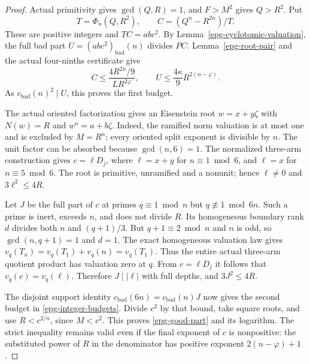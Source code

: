 \begin{proof}
Actual primitivity gives $\gcd(Q,R)=1$, and $F>M^2$ gives
$Q>R^2$. Put
\[
 T=\Phi_n(Q,R^2),\qquad
 C=(Q^n-R^{2n})/T.
\]
These are positive integers and $TC=ab c^2$. By
Lemma~\ref{epg-cyclotomic-valuation}, the full bad part
$U=(ab c^2)_{\mathrm{bad}}(n)$ divides $PC$.
Lemma~\ref{epg-root-pair} and the actual four-ninths certificate give
\[
 C\le\frac{4R^{2n}/9}{LR^{2\varphi}},\qquad
 U\le\frac{4\kappa}{9}R^{2(n-\varphi)}.
\]
As $c_{\mathrm{bad}}(n)^2\mid U$, this proves the first budget.

The actual oriented factorization gives an Eisenstein root
$w=x+y\zeta$ with $N(w)=R$ and $w^n=a+b\zeta$.
Indeed, the ramified norm valuation is at most one and is excluded
by $M=R^n$; every oriented split exponent is divisible by $n$.
The unit factor can be absorbed because $\gcd(n,6)=1$.
The normalized three-arm construction gives $c=\ell D_j$,
where $\ell=x+y$ for $n\equiv1\bmod6$, and $\ell=x$ for
$n\equiv5\bmod6$. The root is primitive, unramified and a
nonunit; hence $\ell\ne0$ and $3\ell^2\le4R$.

Let $J$ be the full part of $c$ at primes $q\equiv1\bmod n$
but $q\not\equiv1\bmod6n$. Such a prime is inert, exceeds $n$,
and does not divide $R$. Its homogeneous boundary rank $d$
divides both $n$ and $(q+1)/3$. But $q+1\equiv2\bmod n$
and $n$ is odd, so $\gcd(n,q+1)=1$ and $d=1$.
The exact homogeneous valuation law gives
$v_q(T_n)=v_q(T_1)+v_q(n)=v_q(T_1)$.
Thus the entire actual three-arm quotient product has valuation
zero at $q$. From $c=\ell D_j$ it follows that
$v_q(c)=v_q(\ell)$. Therefore $J\mid|\ell|$ with full depths,
and $3J^2\le4R$.

The disjoint support identity
$c_{\mathrm{bad}}(6n)=c_{\mathrm{bad}}(n)J$ now gives the second
budget in \eqref{epg-integer-budgets}. Divide $c^2$ by that
bound, take square roots, and use $R<c^{2/n}$, since $M<c^2$.
This proves \eqref{epg-good-part} and its logarithm. The strict
inequality remains valid even if the final exponent of $c$ is
nonpositive: the substituted power of $R$ in the denominator
has positive exponent $2(n-\varphi)+1$.
\end{proof}

